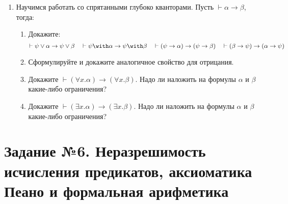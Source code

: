 \documentclass[10pt,a4paper,oneside]{article}
\begin{document}
\begin{enumerate}
\item Научимся работать со спрятанными глубоко кванторами. Пусть $\vdash\alpha\rightarrow\beta$, тогда:
\begin{enumerate}
\item Докажите: $$\vdash\psi\vee\alpha \rightarrow \psi\vee\beta\quad\vdash\psi\with\alpha \rightarrow \psi\with\beta\quad
\vdash(\psi\rightarrow\alpha) \rightarrow (\psi\rightarrow\beta)\quad\vdash(\beta\rightarrow\psi) \rightarrow (\alpha\rightarrow\psi)$$
\item Сформулируйте и докажите аналогичное свойство для отрицания.
\item Докажите $\vdash(\forall x.\alpha)\rightarrow(\forall x.\beta)$. 
Надо ли наложить на формулы $\alpha$ и $\beta$ какие-либо ограничения?
\item Докажите $\vdash(\exists x.\alpha)\rightarrow(\exists x.\beta)$. 
Надо ли наложить на формулы $\alpha$ и $\beta$ какие-либо ограничения?
\end{enumerate}

\end{enumerate}

\section*{Задание №6. Неразрешимость исчисления предикатов, аксиоматика Пеано и формальная арифметика}
\end{document}
